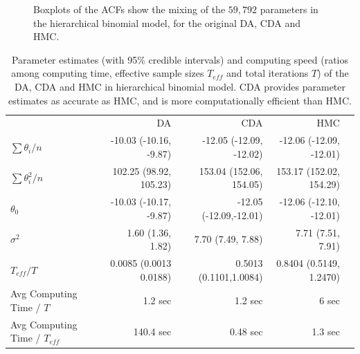 \documentclass[11pt]{article}
\begin{document}
 
\begin{figure}[H]
  {\caption{Boxplots of the ACFs show the mixing of the $59,792$ parameters in the hierarchical binomial model, for the original DA\citep{polson2013bayesian}, CDA and HMC. \label{data_binomial}}}
  {%
    \qquad
     \qquad
  }
\end{figure}
 
 
\begin{table}[H]
\small
\centering
\begin{tabular}{|l |r |r| r| r |} 
 \hline
                          & DA & CDA & HMC\\
 [0.5ex]

 $ \sum \theta_i/n$      & -10.03 (-10.16, -9.87)& -12.05 (-12.09, -12.02) &  -12.06 (-12.09, -12.01)\\
 $ \sum \theta_i^2/n$      & 102.25 (98.92, 105.23)& 153.04 (152.06, 154.05) &  153.17 (152.02, 154.29)\\
$\theta_0$          & -10.03 (-10.17, -9.87)& -12.05 (-12.09,-12.01) &  -12.06 (-12.10, -12.01)\\
$\sigma^2$         & 1.60 (1.36, 1.82)&   7.70 (7.49, 7.88)  & 7.71 (7.51, 7.91)\\
$T_{eff} / T$ & 0.0085 (0.0013 0.0188) & 0.5013 (0.1101,1.0084) & 0.8404 (0.5149, 1.2470)\\
Avg Computing Time /  $T$  & 1.2 sec       & 1.2 sec        & 6 sec\\
Avg Computing Time /  $T_{eff}$  & 140.4 sec       & 0.48 sec        & 1.3 sec\\
 \hline
\end{tabular}
\caption{Parameter estimates (with 95\% credible intervals) and computing speed (ratios among computing time, effective sample sizes $T_{eff}$ and total iterations $T$) of the DA, CDA and HMC in hierarchical binomial model. CDA provides parameter estimates as accurate as HMC, and is more computationally efficient than HMC.}
\label{tab:binomial}
\end{table}
\end{document}
